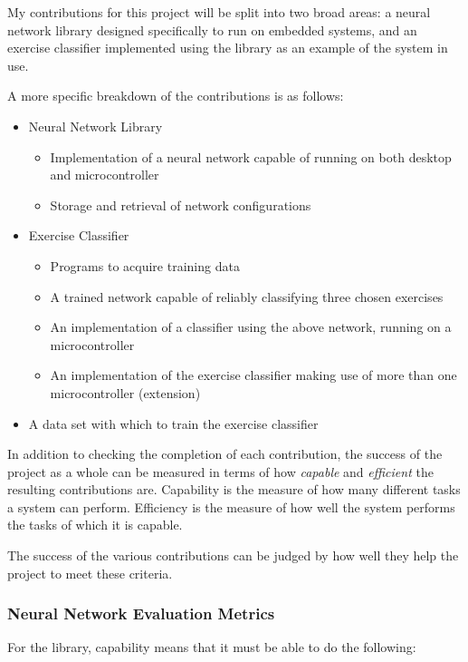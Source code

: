 \documentclass[a4paper]{article}
\begin{document}
My contributions for this project will be split into two broad areas: a neural network library designed specifically to run on embedded systems, and an exercise classifier implemented using the library as an example of the system in use.

A more specific breakdown of the contributions is as follows:

\begin{itemize}
\item Neural Network Library 
  \begin{itemize}
  \item Implementation of a neural network capable of running on  both desktop and microcontroller
    \item Storage and retrieval of network configurations
  \end{itemize}
\item Exercise Classifier
  \begin{itemize}
  \item Programs to acquire training data
    \item A trained network capable of reliably classifying three chosen exercises
    \item An implementation of a classifier using the above network, running on a microcontroller
    \item An implementation of the exercise classifier making use of more than one microcontroller (extension)
  \end{itemize}
\item A data set with which to train the exercise classifier
\end{itemize}

In addition to checking the completion of each contribution, the success of the project as a whole can be measured in terms of how \textit{capable} and \textit{efficient} the resulting contributions are. Capability is the measure of how many different tasks a system can perform.
Efficiency is the measure of how well the system performs the tasks of which it is capable. 

The success of the various contributions can be judged by how well they help the project to meet these criteria.

\subsubsection{Neural Network Evaluation Metrics}
\label{subsubsec:in_cs_nnmetrics}

For the library, capability means that it must be able to do the following:
\end{document}
